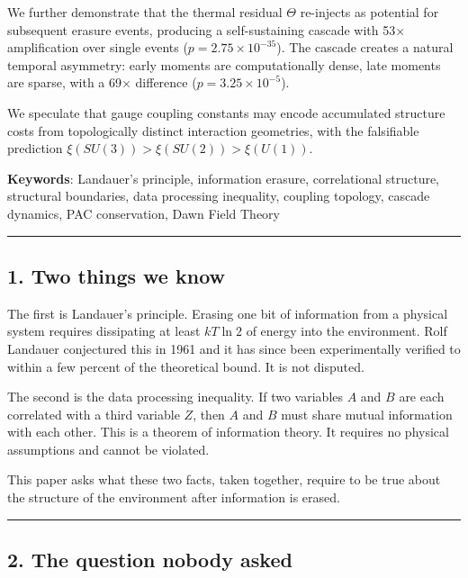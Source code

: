 \documentclass[
  11pt,
  a4paper]{article}
\begin{document}
We further demonstrate that the thermal residual \(\Theta\) re-injects
as potential for subsequent erasure events, producing a self-sustaining
cascade with 53× amplification over single events
(\(p = 2.75 \times 10^{-35}\)). The cascade creates a natural temporal
asymmetry: early moments are computationally dense, late moments are
sparse, with a 69× difference (\(p = 3.25 \times 10^{-5}\)).

We speculate that gauge coupling constants may encode accumulated
structure costs from topologically distinct interaction geometries, with
the falsifiable prediction \(\xi(SU(3)) > \xi(SU(2)) > \xi(U(1))\).

\textbf{Keywords}: Landauer's principle, information erasure,
correlational structure, structural boundaries, data processing
inequality, coupling topology, cascade dynamics, PAC conservation, Dawn
Field Theory

\begin{center}\rule{0.5\linewidth}{0.5pt}\end{center}

\subsection{1. Two things we know}\label{two-things-we-know}

The first is Landauer's principle. Erasing one bit of information from a
physical system requires dissipating at least \(kT \ln 2\) of energy
into the environment. Rolf Landauer conjectured this in 1961 and it has
since been experimentally verified to within a few percent of the
theoretical bound. It is not disputed.

The second is the data processing inequality. If two variables \(A\) and
\(B\) are each correlated with a third variable \(Z\), then \(A\) and
\(B\) must share mutual information with each other. This is a theorem
of information theory. It requires no physical assumptions and cannot be
violated.

This paper asks what these two facts, taken together, require to be true
about the structure of the environment after information is erased.

\begin{center}\rule{0.5\linewidth}{0.5pt}\end{center}

\subsection{2. The question nobody
asked}\label{the-question-nobody-asked}
\end{document}
